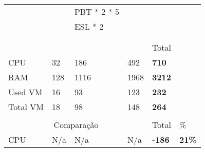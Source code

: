\begin{table}[H]
\begin{tabular}{|l|l|l|l|l|l|}
                                     &                                             & \cellcolor[HTML]{A9D08E}PBT * 2 * 5        &              &                              & \\ 
                                     &                                             & \cellcolor[HTML]{A9D08E}ESL * 2            &                 & & \\ 
                                     &                                             &                                            &              &                              & \\ 
                                     &                                             &                                            &              &                              & \\ 
                                     &                                             &                                            &                  & Total                        & \\ \cline{1-5}
    \cellcolor[HTML]{C0C0C0}CPU      & 32                                          & 186                                        & 492                                          & \textbf{710}                 & \\ \cline{1-5}
    \cellcolor[HTML]{C0C0C0}RAM      & 128                                         & 1116                                       & 1968                                          & \textbf{3212}                & \\ \cline{1-5}
    \cellcolor[HTML]{C0C0C0}Used VM  & 16                                          & 93                                        & 123                                           & \textbf{232}                 & \\ \cline{1-5}
    \cellcolor[HTML]{C0C0C0}Total VM & 18                                          & 98                                        & 148                                           & \textbf{264}                 & \\ \cline{1-5}
      &                                              &                                              &               &               & \\ \cline{1-6}
    \multicolumn{4}{c}{\cellcolor[HTML]{C0C0C0}Comparação}                       & Total         & \%             \\ \cline{1-6}
    \cellcolor[HTML]{C0C0C0}CPU                             & N/a                                                    & N/a                                                    & N/a & \textbf{-186} & \textbf{21\%} \\ \cline{1-6}

\end{tabular}
\end{table}
